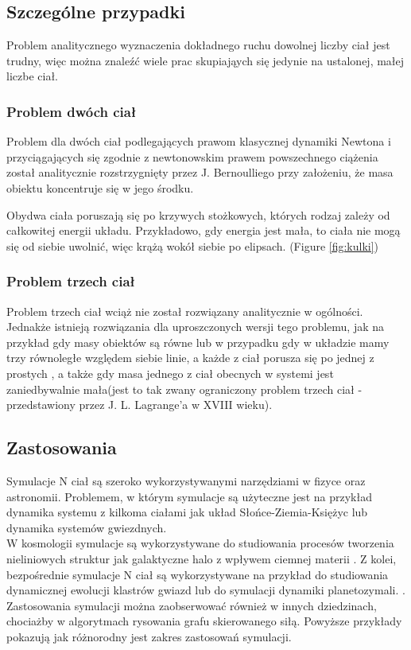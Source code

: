 \documentclass[14pt,twoside,a4paper]{article}
\theoremstyle{definition}
\begin{document}
\subsection{\Large Szczególne przypadki}
Problem analitycznego wyznaczenia dokładnego ruchu dowolnej liczby ciał jest trudny, więc można znaleźć wiele prac skupiająych się jedynie na ustalonej, małej liczbe ciał.

\subsubsection{\large Problem dwóch ciał}
Problem dla dwóch ciał podlegających prawom klasycznej dynamiki Newtona i przyciągających się zgodnie z newtonowskim prawem powszechnego ciążenia został analitycznie rozstrzygnięty przez J. Bernoulliego przy założeniu, że masa obiektu koncentruje się w jego środku. \cite[str.~1-49]{fund}

Obydwa ciała poruszają się po krzywych stożkowych, których rodzaj zależy od całkowitej energii układu. Przykładowo, gdy energia jest mała, to ciała nie mogą się od siebie uwolnić, więc krążą wokół siebie po elipsach. (Figure \ref{fig:kulki})

\subsubsection{\large Problem trzech ciał}
Problem trzech ciał wciąż nie został rozwiązany analitycznie w ogólności. Jednakże istnieją rozwiązania dla uproszczonych wersji tego problemu, jak na przykład gdy masy obiektów są równe \cite{threebody1} lub w przypadku gdy w układzie mamy trzy równoległe względem siebie linie, a każde z ciał porusza się po jednej z prostych \cite{threebody2}, a także gdy masa jednego z ciał obecnych w systemi jest zaniedbywalnie mała(jest to tak zwany ograniczony problem trzech ciał - przedstawiony przez J. L. Lagrange'a w XVIII wieku). \cite{szebehely}


\subsection{\Large Zastosowania}
Symulacje N ciał są szeroko wykorzystywanymi narzędziami w fizyce oraz astronomii. Problemem, w którym symulacje są użyteczne jest na przykład dynamika systemu z kilkoma ciałami jak układ Słońce-Ziemia-Księżyc \cite{SEMmisc} lub dynamika systemów gwiezdnych. \cite{chaosMisc}\\
W kosmologii symulacje są wykorzystywane do studiowania procesów tworzenia nieliniowych struktur jak galaktyczne halo z wpływem ciemnej materii \cite{haloDensity}. 
Z kolei, bezpośrednie symulacje N ciał są wykorzystywane na przykład do studiowania dynamicznej ewolucji klastrów gwiazd lub do symulacji dynamiki planetozymali. \cite{dirNBody}. Zastosowania symulacji można zaobserwować również w innych dziedzinach, chociażby w algorytmach rysowania grafu skierowanego siłą. \cite{visGraph} Powyższe przykłady pokazują jak różnorodny jest zakres zastosowań symulacji.
\newpage
\end{document}
